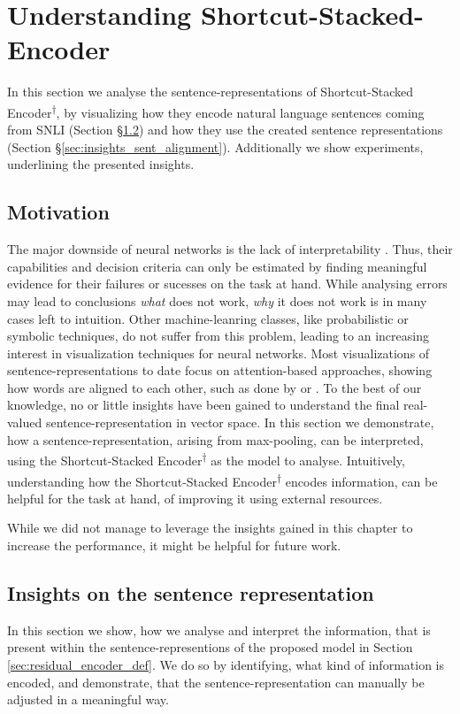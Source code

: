 \section{Understanding Shortcut-Stacked-Encoder}\label{sec:understanding}
In this section we analyse the sentence-representations of Shortcut-Stacked Encoder\textsuperscript{$\dagger$}, by visualizing how they encode natural language sentences coming from \ac{SNLI} (Section §\ref{sec:insights_sent_repr}) and how they use the created sentence representations (Section §\ref{sec:insights_sent_alignment}). Additionally we show experiments, underlining the presented insights.
\subsection{Motivation}
The major downside of neural networks is the lack of interpretability \citep{goldberg2017Apr}. Thus, their capabilities and decision criteria can only be estimated by finding meaningful evidence for their failures or sucesses on the task at hand. While analysing errors may lead to conclusions \textit{what} does not work, \textit{why} it does not work is in many cases left to intuition. Other machine-leanring classes, like probabilistic or symbolic techniques, do not suffer from this problem, leading to an increasing interest in visualization techniques for neural networks. Most visualizations of sentence-representations to date focus on attention-based approaches, showing how words are aligned to each other, such as done by \cite{shen2018reinforced} or \cite{im2017distance}. To the best of our knowledge, no or little insights have been gained to understand the final real-valued sentence-representation in vector space. In this section we demonstrate, how a sentence-representation, arising from max-pooling, can be interpreted, using the Shortcut-Stacked Encoder\textsuperscript{$\dagger$} as the model to analyse. Intuitively, understanding how the Shortcut-Stacked Encoder\textsuperscript{$\dagger$} encodes information, can be helpful for the task at hand, of improving it using external resources. 
\newline

\noindent
While we did not manage to leverage the insights gained in this chapter to increase the performance, it might be helpful for future work.

\subsection{Insights on the sentence representation}\label{sec:insights_sent_repr}
In this section we show, how we analyse and interpret the information, that is present within the sentence-representions of the proposed model in Section \ref{sec:residual_encoder_def}. We do so by identifying, what kind of information is encoded, and demonstrate, that the sentence-representation can manually be adjusted in a meaningful way.
